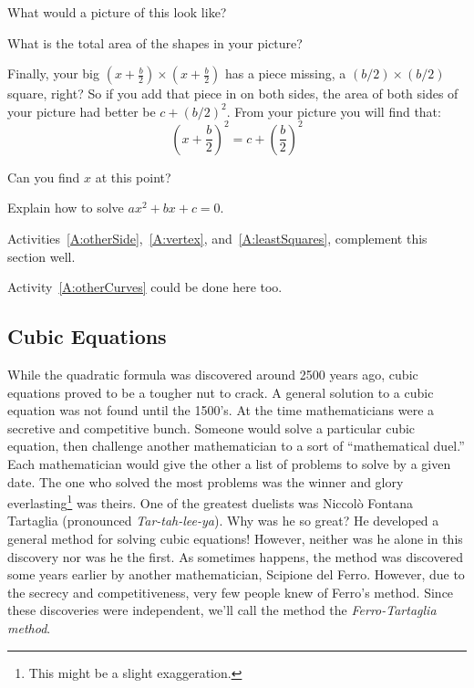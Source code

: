 \begin{question} What would a picture of this look like?
\end{question}
\QM

\begin{question} What is the total area of the shapes in your picture?
\end{question}
\QM

Finally, your big $(x + \frac{b}{2}) \times (x + \frac{b}{2})$ has a
piece missing, a $(b/2) \times (b/2)$ square, right? So if you add
that piece in on both sides, the area of both sides of your picture
had better be $c + (b/2)^2$. From your picture you will find that:
\[
\left(x + \frac{b}{2}\right)^2 = c + \left(\frac{b}{2}\right)^2
\]

\begin{question} 
Can you find $x$ at this point?
\end{question}
\QM

\begin{question}
Explain how to solve $ax^2 + bx + c = 0$.
\end{question}
\QM




\begin{activitynote}
Activities~\ref{A:otherSide},~\ref{A:vertex}, and~\ref{A:leastSquares},
complement this section well.
\end{activitynote}

\begin{activitynote}
Activity~\ref{A:otherCurves} could be done here too.  %
\end{activitynote}

\subsection{Cubic Equations}

While the quadratic formula was discovered around 2500 years ago,
cubic equations proved to be a tougher nut to crack. A general
solution to a cubic equation was not found until the 1500's. At the
time mathematicians were a secretive and competitive bunch. Someone
would solve a particular cubic equation, then challenge another
mathematician to a sort of ``mathematical duel.'' Each mathematician
would give the other a list of problems to solve by a given date. The
one who solved the most problems was the winner and glory
everlasting\footnote{This might be a slight exaggeration.}  was
theirs. One of the greatest duelists was Niccol\`{o} Fontana Tartaglia
(pronounced \textit{Tar-tah-lee-ya}). Why was he so great? He
developed a general method for solving cubic equations! However,
neither was he alone in this discovery nor was he the first. As
sometimes happens, the method was discovered some years earlier by
another mathematician, Scipione del Ferro. However, due to the secrecy
and competitiveness, very few people knew of Ferro's method. Since these
discoveries were independent, we'll call the method the
\textit{Ferro-Tartaglia method}.

